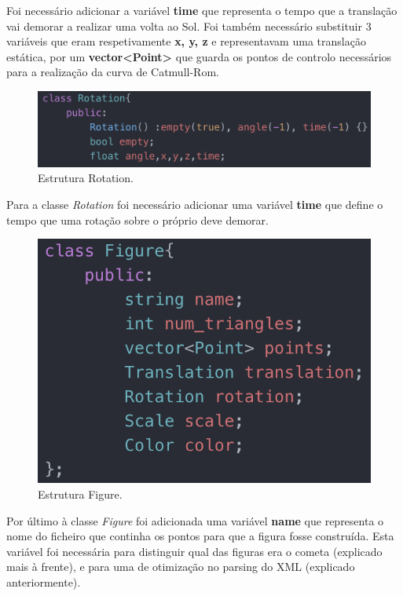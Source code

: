 \documentclass[a4paper]{article}
\begin{document}
Foi necessário adicionar a variável \textbf{time} que representa o tempo que a translação vai demorar a realizar uma volta ao Sol. Foi também necessário substituir 3 variáveis que eram respetivamente \textbf{x, y, z} e representavam uma translação estática, por um \textbf{vector<Point>} que guarda os pontos de controlo necessários para a realização da curva de Catmull-Rom.

\begin{figure}[H]
\centering
\includegraphics[scale=0.65]{rotation.png}
\caption{Estrutura Rotation.}
\label{img:rotation}
\end{figure}

Para a classe \textit{Rotation} foi necessário adicionar uma variável \textbf{time} que define o tempo que uma rotação sobre o próprio deve demorar.

\begin{figure}[H]
\centering
\includegraphics[scale=0.75]{figure.png}
\caption{Estrutura Figure.}
\label{img:figure}
\end{figure}

Por último à classe \textit{Figure} foi adicionada uma variável \textbf{name} que representa o nome do ficheiro que continha os pontos para que a figura fosse construída. Esta variável foi necessária para distinguir qual das figuras era o cometa (explicado mais à frente), e para uma de otimização no parsing do XML (explicado anteriormente).
\end{document}
